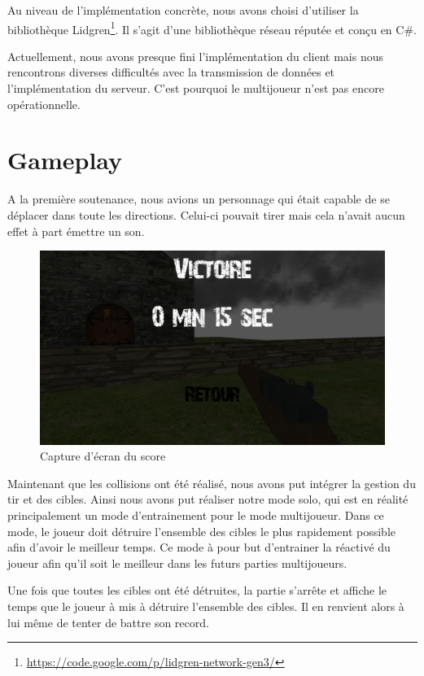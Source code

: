 \documentclass[11pt]{report}
\begin{document}
Au niveau de l'implémentation concrète, nous avons choisi d'utiliser la bibliothèque Lidgren\footnote{\url{https://code.google.com/p/lidgren-network-gen3/}}. Il s'agit d'une bibliothèque réseau réputée et conçu en C\#.

Actuellement, nous avons presque fini l'implémentation du client mais nous rencontrons diverses difficultés avec la transmission de données et l'implémentation du serveur. C'est pourquoi le multijoueur n'est pas encore opérationnelle.

\newpage
\section{Gameplay}

A la première soutenance, nous avions un personnage qui était capable de se déplacer dans toute les directions. Celui-ci pouvait tirer mais cela n'avait aucun effet à part émettre un son.

\begin{figure}[htbp]
\centering
\includegraphics[scale=0.13]{score.png}
\caption{Capture d'écran du score}
\end{figure}

Maintenant que les collisions ont été réalisé, nous avons put intégrer la gestion du tir et des cibles. Ainsi nous avons put réaliser notre mode solo, qui est en réalité principalement un mode d'entrainement pour le mode multijoueur. Dans ce mode, le joueur doit détruire l'ensemble des cibles le plus rapidement possible afin d'avoir le meilleur temps. Ce mode à pour but d'entrainer la réactivé du joueur afin qu'il soit le meilleur dans les futurs parties multijoueurs.

Une fois que toutes les cibles ont été détruites, la partie s'arrête et affiche le temps que le joueur à mis à détruire l'ensemble des cibles. Il en renvient alors à lui même de tenter de battre son record.
\end{document}
